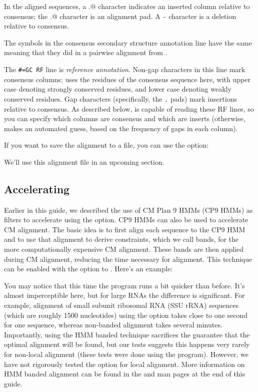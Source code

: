 In the aligned sequences, a \verb@.@ character indicates an inserted
column relative to consensus; the \verb@.@ character is an alignment
pad. A \verb+-+ character is a deletion relative to consensus.

The symbols in the consensus secondary structure annotation line have
the same meaning that they did in a pairwise alignment from
.

The {\small\verb+#=GC RF+} line is \emph{reference
annotation}. Non-gap characters in this line mark consensus columns;
 uses the residues of the consensus sequence here, with
upper case denoting strongly conserved residues, and lower case
denoting weakly conserved residues. Gap characters (specifically, the
\verb+.+ pads) mark insertions relative to consensus. As described
below,  is capable of reading these RF lines, so you can
specify which columns are consensus and which are inserts (otherwise,
 makes an automated guess, based on the frequency of
gaps in each column).

If you want to save the alignment to a file, you can use the 
option:


We'll use this  alignment file in an upcoming section.

\subsection{Accelerating }
Earlier in this guide, we described the use of CM Plan 9 HMMs (CP9
HMMs) as filters to accelerate  using the
 option. CP9 HMMs can also be used to accelerate CM
alignment. The basic idea is to first align each sequence to the CP9
HMM and to use that alignment to derive constraints, which we call
bands, for the more
computationally expensive CM alignment. These bands are then
applied during CM alignment, reducing the time necessary for
alignment. This technique can be enabled with the 
option to . Here's an
example: 


You may notice that this time the program runs a bit
quicker than before. It's almost imperceptible here, but for large RNAs the
difference is significant. For example, alignment of small subunit ribosomal
RNA (SSU rRNA) sequences (which are roughly 1500 nucleotides) using
the  option takes close to one second for one sequence, whereas
non-banded alignment takes several minutes. Importantly, using the HMM banded
technique sacrifices the guarantee that the optimal alignment will be
found, but our tests suggests this happens very rarely for non-local
alignment (these tests were done using the  program).
However, we have not rigorously tested the  option for local
alignment. More information on HMM banded alignment can be found in
the  and  man pages at the end of this guide.

